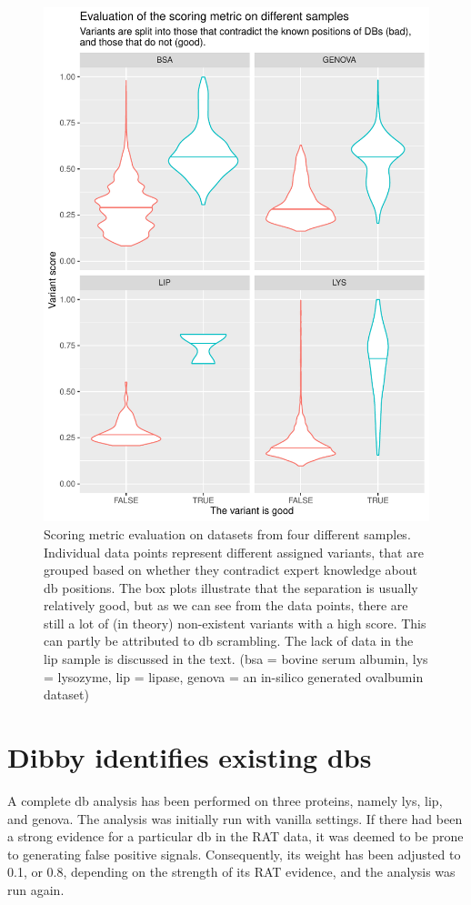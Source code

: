 \begin{figure}
  \centering
  \includegraphics[width=0.85\linewidth]{img/scoring-metric-evaluation.pdf}
  \caption{Scoring metric evaluation on datasets from four different samples. Individual data points represent different assigned variants, that are grouped based on whether they contradict expert knowledge about \gls*{db} positions. The box plots illustrate that the separation is usually relatively good, but as we can see from the data points, there are still a lot of (in theory) non-existent variants with a high score. This can partly be attributed to \gls*{db} scrambling. The lack of data in the \gls*{lip} sample is discussed in the text. (\gls*{bsa} = bovine serum albumin, \gls*{lys} = lysozyme, \gls*{lip} = lipase, \gls*{genova} = an in-silico generated ovalbumin dataset)}\label{fig:scoring-metric}
\end{figure}

\section{Dibby identifies existing \glspl*{db}}

A complete \gls*{db} analysis has been performed on three proteins, namely \gls*{lys}, \gls*{lip}, and \gls*{genova}\@. The analysis was initially run with vanilla settings. If there had been a strong evidence for a particular \gls*{db} in the RAT data, it was deemed to be prone to generating false positive signals. Consequently, its weight has been adjusted to 0.1, or 0.8, depending on the strength of its RAT evidence, and the analysis was run again.

